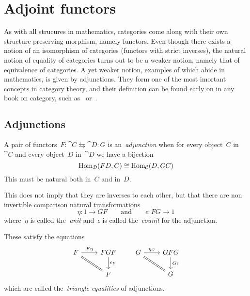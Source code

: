 \documentclass[../TFG.tex]{subfiles}
\begin{document}
\section{Adjoint functors}
As with all strucures in mathematics, categories come along with their own
structure preserving morphism, namely functors. Even though there exists a
notion of an isomorphism of categories (functors with strict inverses), the
natural notion of equality of categories turns out to be a weaker notion, namely
that of equivalence of categories. A yet weaker notion, examples of which abide
in mathematics, is given by adjunctions. They form one of the most imortant
concepts in category theory, and their definition can be found early on in any
book on category, such as~\cite{Awodey} or~\cite{Leinster}.

\subsection{Adjunctions}
\begin{definition}[Adjunction]
A pair of functors~\(F:\cat{C}\leftrightarrows\cat{D}:G\) is
an~\emph{adjunction} when for every object~\(C\) in~\(\cat{C}\) and every
object~\(D\) in~\(\cat{D}\) we have a bijection
\[
    \operatorname{Hom}_{\mathcal{D}}(FD, C) \cong \operatorname{Hom}_{\mathcal{C}}(D, GC)
\]
This must be natural both in~\(C\) and in~\(D\).
\end{definition}

This does not imply that they are inverses to each other, but that there are non
invertible comparison natural transformations
\[
    \eta:1\longrightarrow GF
    \qquad
    \text{and}
    \qquad
    \epsilon:FG\longrightarrow 1
\]
where~\(\eta\) is called the~\emph{unit} and~\(\epsilon\) is
called the~\emph{counit} for the adjunction.

These satisfy the equations
\[
    \begin{tikzcd}
        F \arrow[r, "F\eta", rightarrow] \arrow[dr, equal] & FGF \arrow[d, "\epsilon_{F}", rightarrow] \\
                                                           & F
    \end{tikzcd}
    \qquad
    \begin{tikzcd}
        G \arrow[r, "\eta_{G}", rightarrow] \arrow[dr, equal] & GFG \arrow[d, "G\epsilon", rightarrow] \\
                                                              & G
    \end{tikzcd}
\]
which are called the~\emph{triangle equalities} of adjunctions.
\end{document}
